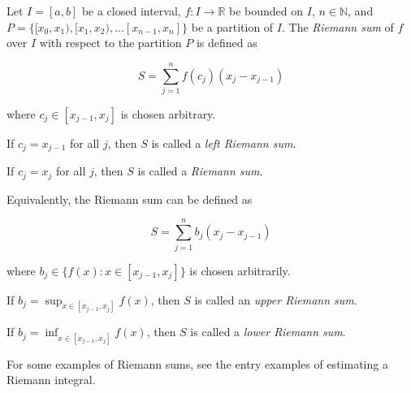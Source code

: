 \documentclass[12pt]{article}
\begin{document}
Let $I=[a,b]$ be a closed interval, $f: I \rightarrow \mathbb{R}$ be bounded on $I$, $n \in \mathbb{N}$, and $P = \{[x_0, x_1), [x_1, x_2), \dots [x_{n-1}, x_n]\}$ be a partition of $I$.  The \emph{Riemann sum} of $f$ over $I$ with respect to the partition $P$ is defined as

$$S=\sum_{j=1}^n f(c_j)(x_j-x_{j-1})$$

where $c_j \in [x_{j-1},x_j]$ is chosen arbitrary.

If $c_j=x_{j-1}$ for all $j$, then $S$ is called a \emph{left Riemann sum}.

If $c_j=x_j$ for all $j$, then $S$ is called a \emph{ Riemann sum}.

Equivalently, the Riemann sum can be defined as

$$S=\sum_{j=1}^n b_j(x_j-x_{j-1})$$

where $b_j \in \{ f(x):x\in[x_{j-1},x_j]\}$ is chosen arbitrarily.

If $\displaystyle b_j=\sup_{x\in[x_{j-1},x_j]} f(x)$, then $S$ is called an \emph{upper Riemann sum}.

If $\displaystyle b_j=\inf_{x\in[x_{j-1},x_j]} f(x)$, then $S$ is called a \emph{lower Riemann sum}.

For some examples of Riemann sums, see the entry examples of estimating a Riemann integral.
\end{document}
